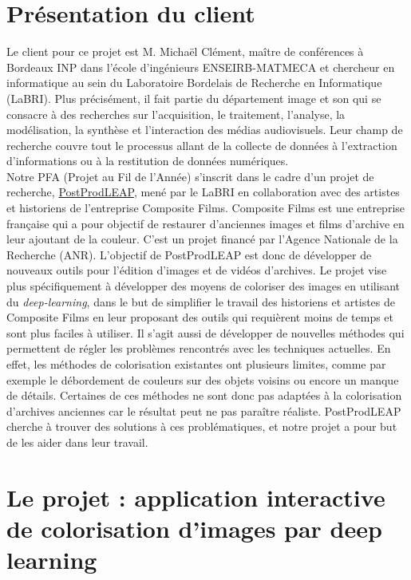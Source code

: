 \documentclass{article}
\begin{document}
\section{Présentation du client}
Le client pour ce projet est M. Michaël Clément, maître de conférences à Bordeaux INP dans l'école d'ingénieurs ENSEIRB-MATMECA et chercheur en informatique au sein du Laboratoire Bordelais de Recherche en Informatique (LaBRI). 
Plus précisément, il fait partie du département image et son qui se consacre à des recherches sur l'acquisition, le traitement, l'analyse, la modélisation, la synthèse et l'interaction des médias audiovisuels.
Leur champ de recherche couvre tout le processus allant de la collecte de données à l'extraction d'informations ou à la restitution de données numériques.\\

Notre PFA (Projet au Fil de l'Année) s’inscrit dans le cadre d’un projet de recherche, \href{https://www.labri.fr/perso/bugeau/PostProdLEAP/}{PostProdLEAP}, mené par le LaBRI en collaboration avec des artistes et historiens de l’entreprise Composite Films. Composite Films est une entreprise française 
qui a pour objectif de restaurer d'anciennes images et films d'archive en leur ajoutant de la couleur. C'est un projet financé par l’Agence Nationale de la Recherche (ANR). L'objectif de PostProdLEAP est donc de développer de nouveaux outils pour l'édition d'images et de vidéos d'archives. Le projet vise plus spécifiquement à développer des moyens de coloriser des images en utilisant du \textit{deep-learning}, dans le but de simplifier le travail des historiens et artistes de Composite Films en leur proposant des outils qui requièrent moins de temps et sont plus faciles à utiliser. Il s'agit aussi de développer de nouvelles méthodes qui permettent de régler les problèmes rencontrés avec les techniques actuelles.
En effet, les méthodes de colorisation existantes ont plusieurs limites, comme par exemple le débordement de couleurs sur des objets voisins ou encore un manque de détails. Certaines de ces méthodes ne sont donc pas adaptées à la colorisation d'archives anciennes car le résultat peut ne pas paraître réaliste. PostProdLEAP cherche à trouver des solutions à ces problématiques, et notre projet a pour but de les aider dans leur travail.


\section{Le projet : application interactive de colorisation d'images par deep learning}
\end{document}

